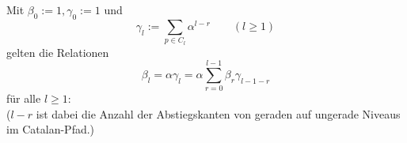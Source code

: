 \documentclass[a4paper, 11pt]{scrreprt}
\begin{document}
Mit \(\beta_0 :=1, \gamma_0:=1 \) und
\begin{equation*}
		\gamma_l:=\sum_{p\in C_l} \alpha^{l-r} \qquad (l\geq 1)
\end{equation*}
gelten die Relationen
\begin{equation}
	\beta_l = \alpha\gamma_l=\alpha\sum_{r=0}^{l-1}\beta_r \gamma_{l-1-r}
\end{equation}
für alle \(l\geq 1\):\\
(\(l-r\) ist dabei die Anzahl der Abstiegskanten von geraden auf ungerade Niveaus im Catalan-Pfad.)
\begin{itemize}

\end{itemize}
\end{document}
